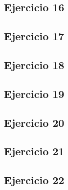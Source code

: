 \documentclass[10pt,a4paper]{article}
\begin{document}
  \subsection{Ejercicio 16}
  \subsection{Ejercicio 17}
  \subsection{Ejercicio 18}
  \subsection{Ejercicio 19}
  \subsection{Ejercicio 20}
  \subsection{Ejercicio 21}
  \subsection{Ejercicio 22}
\end{document}
